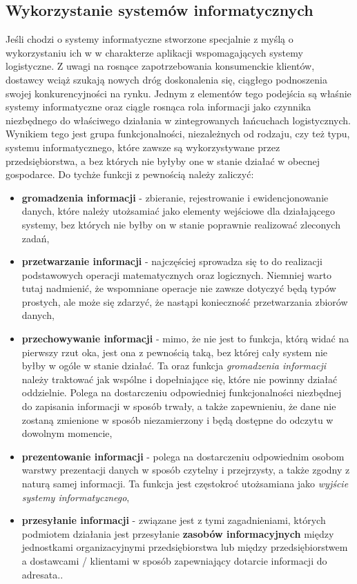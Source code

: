 	\subsection{Wykorzystanie systemów informatycznych}
		Jeśli chodzi o systemy informatyczne stworzone specjalnie z myślą o wykorzystaniu ich w 
		w charakterze aplikacji wspomagających systemy logistyczne. Z uwagi na rosnące zapotrzebowania
		konsumenckie klientów, dostawcy wciąż szukają nowych dróg doskonalenia się, ciągłego podnoszenia
		swojej konkurencyjności na rynku. Jednym z elementów tego podejścia są właśnie systemy informatyczne 
		oraz ciągle rosnąca rola informacji jako czynnika niezbędnego do właściwego działania w 
		zintegrowanych łańcuchach logistycznych. Wynikiem tego jest grupa funkcjonalności, niezależnych od
		rodzaju, czy też typu, systemu informatycznego, które zawsze są wykorzystywane przez przedsiębiorstwa,
		a bez których nie byłyby one w stanie działać w obecnej gospodarce.	
		Do tychże funkcji z pewnością należy zaliczyć:
		\begin{itemize}
			\item \textbf{gromadzenia informacji} - 
				zbieranie, rejestrowanie i ewidencjonowanie danych, które należy utożsamiać jako elementy wejściowe
				dla działającego systemy, bez których nie byłby on w stanie poprawnie realizować zleconych zadań,
			\item \textbf{przetwarzanie informacji} - 
				najczęściej sprowadza się to do realizacji podstawowych operacji
				matematycznych oraz logicznych. Niemniej warto tutaj nadmienić, że wspomniane operacje nie zawsze dotyczyć będą
				typów prostych, ale może się zdarzyć, że nastąpi konieczność przetwarzania zbiorów danych,
			\item \textbf{przechowywanie informacji} - 
				mimo, że nie jest to funkcja, którą widać na pierwszy rzut oka, jest ona z pewnością taką, bez której cały
				system nie byłby w ogóle w stanie działać. Ta oraz funkcja \emph{gromadzenia informacji} należy traktować jak wspólne
				i dopełniające się, które nie powinny działać oddzielnie. Polega na dostarczeniu odpowiedniej funkcjonalności 
				niezbędnej do zapisania informacji w sposób trwały, a także zapewnieniu, że dane nie zostaną zmienione w sposób
				niezamierzony i będą dostępne do odczytu w dowolnym momencie,
			\item \textbf{prezentowanie informacji} - 
				polega na dostarczeniu odpowiednim osobom warstwy prezentacji danych w sposób czytelny i przejrzysty, a także zgodny
				z naturą samej informacji. Ta funkcja jest częstokroć utożsamiana jako \emph{wyjście systemy informatycznego},
			\item \textbf{przesyłanie informacji} - 
				związane jest z tymi zagadnieniami, których podmiotem działania jest przesyłanie \textbf{zasobów informacyjnych}
				między jednostkami organizacyjnymi przedsiębiorstwa lub między przedsiębiorstwem a dostawcami / klientami w sposób
				zapewniający dotarcie informacji do adresata.\cite{logistyka_w_przedsiebiorstwie}.
		\end{itemize}
